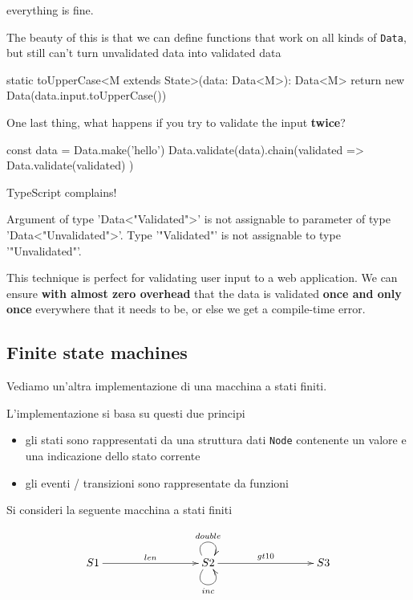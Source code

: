 \documentclass[12pt]{article}
\theoremstyle{definition}
\newenvironment{code}
  {\vspace{0.5cm} \VerbatimEnvironment\begin{typescriptcode}}
  {\end{typescriptcode} \vspace{0.2cm}}
\begin{document}
everything is fine.

The beauty of this is that we can define functions that work on all kinds of \texttt{Data},
but still can't turn unvalidated data into validated data

\begin{code}
static toUpperCase<M extends State>(data: Data<M>): Data<M> {
  return new Data(data.input.toUpperCase())
}
\end{code}

One last thing, what happens if you try to validate the input \textbf{twice}?

\begin{code}
const data = Data.make('hello')
Data.validate(data).chain(validated =>
  Data.validate(validated)
)
\end{code}

TypeScript complains!

\begin{code}
[ts]
Argument of type 'Data<"Validated">' is not assignable
  to parameter of type 'Data<"Unvalidated">'.
  Type '"Validated"' is not assignable to type '"Unvalidated"'.
\end{code}

This technique is perfect for validating user input to a web application.
We can ensure \textbf{with almost zero overhead} that the data is validated \textbf{once and only once} everywhere that it needs to be,
or else we get a compile-time error.

\subsection{Finite state machines}

Vediamo un'altra implementazione di una macchina a stati finiti.

L'implementazione si basa su questi due principi

\begin{itemize}
\item gli stati sono rappresentati da una struttura dati \texttt{Node} contenente un valore e una indicazione dello stato corrente
\item gli eventi / transizioni sono rappresentate da funzioni
\end{itemize}

Si consideri la seguente macchina a stati finiti

\[
\xymatrixrowsep{3cm}
\xymatrixcolsep{3cm}
\xymatrix{
  S1 \ar[r]^{len} & S2 \ar@(ul,ur)^{double} \ar@(dl,dr)_{inc} \ar[r]^{gt10} & S3 \\
}
\]
\end{document}
